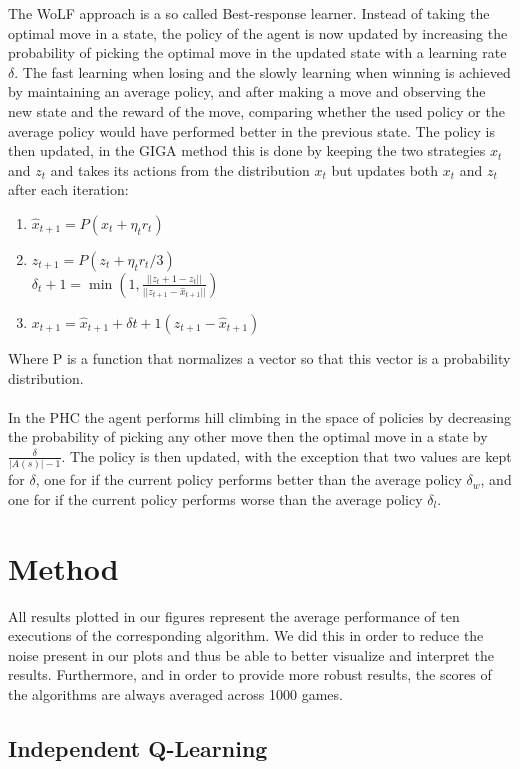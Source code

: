 \documentclass[a4paper,12pt]{article}
\begin{document}
The WoLF approach is a so called Best-response learner. Instead of taking the optimal move in a state, the policy of the agent is now updated by increasing the probability of picking
the optimal move in the updated state with a learning rate $ \delta $. The fast learning when losing and the slowly learning when winning is achieved by maintaining an average policy, and after making a move and observing the new state and the reward of the move, comparing whether the used policy or the average policy would have performed better in the previous state. The policy is then updated, in the GIGA method this is done by keeping the two strategies $x_t$ and $z_t$ and takes its actions from the distribution $x_t$ but updates both $x_t$ and $z_t$ after each iteration:
\begin{enumerate}
\centering
  \item $\hat{x}_{t+1} = P(x_t + \eta_tr_t)$
  \item $z_{t+1} = P(z_t + \eta_tr_t/3)$ \\
  $\delta_t+1 = \min(1, \frac{||z_t+1-z_t||}{||z_{t+1}-\hat{x}_{t+1}||})$ 
  \item $x_{t+1} = \hat{x}_{t+1} + \delta{t+1}(z_{t+1} - \hat{x}_{t+1} )$
\end{enumerate}
Where P is a function that normalizes a vector so that this vector is a probability distribution.
 \\
 \\
 In the PHC \cite{PHC} the agent performs hill climbing in the space of policies by decreasing the probability of picking any other move then the optimal move in a state by $ \frac{\delta}{|A(s)|-1} $.
The policy is then updated, with the exception that two values are kept for $ \delta$, one for if the current policy performs better than the average policy $ \delta_w$, and one for if the current policy performs worse than the average policy $\delta_l$.
\section{Method}

All results plotted in our figures represent the average performance of ten executions of the corresponding algorithm. We did this in order to reduce the noise present in our plots and thus be able to better visualize and interpret the results. Furthermore, and in order to provide more robust results, the scores of the algorithms are always averaged across 1000 games.

\subsection{Independent Q-Learning}
\end{document}

